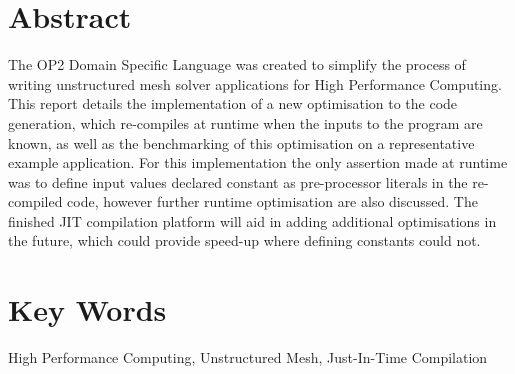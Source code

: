 
%
\vspace*{\fill}
\begin{adjustwidth}{60pt}{60pt}
\begin{center}
\section*{Abstract}
\normalsize
The OP2 Domain Specific Language was created to simplify the process of writing unstructured mesh solver applications for High Performance Computing. This report details the implementation of a new optimisation to the code generation, which re-compiles at runtime when the inputs to the program are known, as well as the benchmarking of this optimisation on a representative example application. For this implementation the only assertion made at runtime was to define input values declared constant as pre-processor literals in the re-compiled code, however further runtime optimisation are also discussed. The finished JIT compilation platform will aid in adding additional optimisations in the future, which could provide speed-up where defining constants could not.
\section*{Key Words}
High Performance Computing, Unstructured Mesh, Just-In-Time Compilation
\end{center}
\end{adjustwidth}
\vspace*{\fill}
